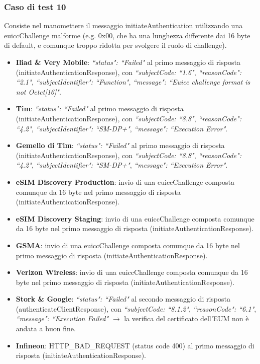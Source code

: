 \documentclass[10pt, oneside]{book}
\begin{document}
\subsubsection{Caso di test 10}
Consiste nel manomettere il messaggio initiateAuthentication utilizzando una euiccChallenge malforme (e.g. 0x00, che ha una lunghezza differente dai 16 byte di default, e comunque troppo ridotta per svolgere il ruolo di challenge).
\begin{itemize}
\item \textbf{Iliad \& Very Mobile}: \textit{``status": ``Failed"} al primo messaggio di risposta (initiateAuthenticationResponse), con \textit{``subjectCode: ``1.6"}, \textit{``reasonCode": ``2.1"}, \textit{``subjectIdentifier": ``Function"}, \textit{``message": ``Euicc challenge format is not Octet[16]"}.
\item \textbf{Tim}: \textit{``status": ``Failed"} al primo messaggio di risposta (initiateAuthenticationResponse), con \textit{``subjectCode: ``8.8"}, \textit{``reasonCode": ``4.2"}, \textit{``subjectIdentifier": ``SM-DP+"}, \textit{``message": ``Execution Error"}.
\item \textbf{Gemello di Tim}:  \textit{``status": ``Failed"} al primo messaggio di risposta (initiateAuthenticationResponse), con \textit{``subjectCode: ``8.8"}, \textit{``reasonCode": ``4.2"}, \textit{``subjectIdentifier": ``SM-DP+"}, \textit{``message": ``Execution Error"}.
\item \textbf{eSIM Discovery Production}: invio di una euiccChallenge composta comunque da 16 byte nel primo messaggio di risposta (initiateAuthenticationResponse).
\item \textbf{eSIM Discovery Staging}: invio di una euiccChallenge composta comunque da 16 byte nel primo messaggio di risposta (initiateAuthenticationResponse).
\item \textbf{GSMA}: invio di una euiccChallenge composta comunque da 16 byte nel primo messaggio di risposta (initiateAuthenticationResponse).
\item \textbf{Verizon Wireless}: invio di una euiccChallenge composta comunque da 16 byte nel primo messaggio di risposta (initiateAuthenticationResponse).
\item \textbf{Stork \& Google}: \textit{``status": ``Failed"} al secondo messaggio di risposta (authenticateClientResponse), con \textit{``subjectCode: ``8.1.2"}, \textit{``reasonCode": ``6.1"}, \textit{``message": ``Execution Failed"} $\rightarrow$ la verifica del certificato dell'EUM non è andata a buon fine.
\item \textbf{Infineon}: HTTP\_BAD\_REQUEST (status code 400) al primo messaggio di risposta (initiateAuthenticationResponse).

\end{itemize}
\end{document}
